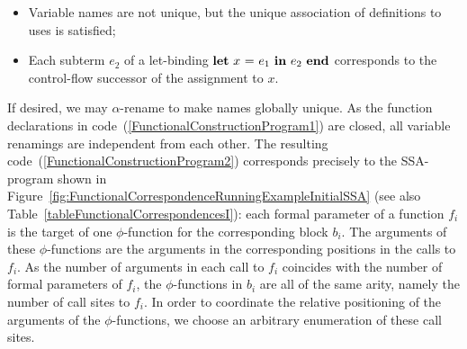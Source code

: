 {\begin{itemize}
\item
  Variable names are not unique, but the unique association of
  definitions to uses is satisfied;

\item
  Each subterm $e_2$ of a let-binding $\mathbf{let}\ {x}\ \mathbf{=}\ {e_1}\ \mathbf{in}\ {e_2}\ \mathbf{end}$
  corresponds to the control-flow successor of the assignment to $x$.

\end{itemize}
If desired, we may $\alpha$-rename to make names globally unique. As
the function declarations in
code~(\ref{FunctionalConstructionProgram1}) are closed, all variable
renamings are independent from each other. The resulting
code~(\ref{FunctionalConstructionProgram2}) corresponds precisely to
the SSA-program shown in
Figure~\ref{fig:FunctionalCorrespondenceRunningExampleInitialSSA} (see
also Table~\ref{tableFunctionalCorrespondencesI}): each formal
parameter of a function $f_i$ is the target of one $\phi$-function for
the corresponding block $b_i$. The arguments of these $\phi$-functions
are the arguments in the corresponding positions in the calls to
$f_i$. As the number of arguments in each call to $f_i$ coincides with
the number of formal parameters of $f_i$, the $\phi$-functions in $b_i$
are all of the same arity, namely the number of call sites to $f_i$.
In order to coordinate the relative positioning of the arguments of
the $\phi$-functions, we choose an arbitrary enumeration of these call
sites.
\begin{functional}
\label{FunctionalConstructionProgram2}

\end{functional}}
